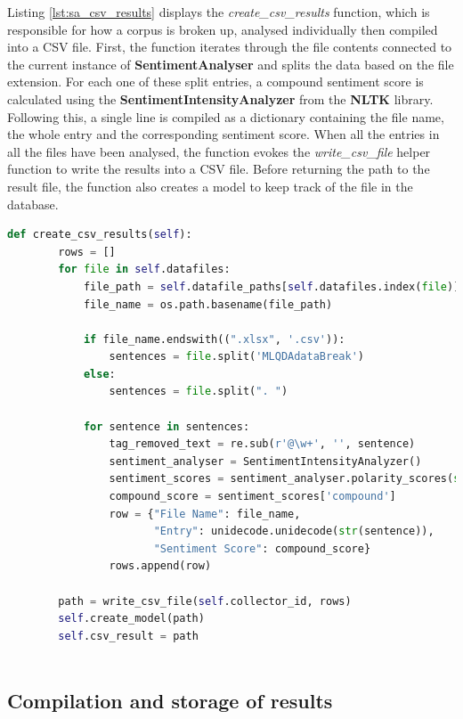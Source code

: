 \documentclass{l4proj}
\begin{document}
Listing \ref{lst:sa_csv_results} displays the \textit{create\_csv\_results} function, which is responsible for how a corpus is broken up, analysed individually then compiled into a CSV file. First,  the function iterates through the file contents connected to the current instance of \textbf{SentimentAnalyser} and splits the data based on the file extension. For each one of these split entries, a compound sentiment score is calculated using the \textbf{SentimentIntensityAnalyzer} from the \textbf{NLTK} library. Following this, a single line is compiled as a dictionary containing the file name, the whole entry and the corresponding sentiment score. When all the entries in all the files have been analysed, the function evokes the \textit{write\_csv\_file} helper function to write the results into a CSV file. Before returning the path to the result file, the function also creates a model to keep track of the file in the database.



\begin{lstlisting}[language=python,
caption={Function to compile results into a CSV file.},
label=lst:sa_csv_results]
    def create_csv_results(self):
        rows = []
        for file in self.datafiles:
            file_path = self.datafile_paths[self.datafiles.index(file)]
            file_name = os.path.basename(file_path)

            if file_name.endswith((".xlsx", '.csv')):
                sentences = file.split('MLQDAdataBreak')
            else:
                sentences = file.split(". ")

            for sentence in sentences:
                tag_removed_text = re.sub(r'@\w+', '', sentence)
                sentiment_analyser = SentimentIntensityAnalyzer()
                sentiment_scores = sentiment_analyser.polarity_scores(str(tag_removed_text))
                compound_score = sentiment_scores['compound']
                row = {"File Name": file_name,
                       "Entry": unidecode.unidecode(str(sentence)),
                       "Sentiment Score": compound_score}
                rows.append(row)

        path = write_csv_file(self.collector_id, rows)
        self.create_model(path)
        self.csv_result = path
        
\end{lstlisting}

\subsection{Compilation and storage of results}
\end{document}
